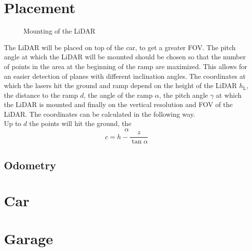 \section{Placement}
\begin{figure}[htpb]
	\centering
	
	\caption{Mounting of the LiDAR}
	\label{fig:tikz_lidar_mount}
\end{figure}
The LiDAR will be placed on top of the car, to get a greater FOV.
The pitch angle at which the LiDAR will be mounted should be chosen so that the number of points in the area at the beginning of the ramp are maximized.
This allows for an easier detection of planes with different inclination angles.
The coordinates at which the lasers hit the ground and ramp depend on the height of the LiDAR $ h_\mathrm{L} $, the distance to the ramp $d$, the angle of the ramp $\alpha$, the pitch angle $\gamma$ at which the LiDAR is mounted and finally on the vertical resolution and FOV of the LiDAR. The coordinates can be calculated in the following way.\\
Up to $d$ the points will hit the ground, the
\begin{equation}
	\alpha
\end{equation}
\[ c = h - \frac{z}{\tan \alpha} \]


\subsection{Odometry}



\section{Car}



\section{Garage}
